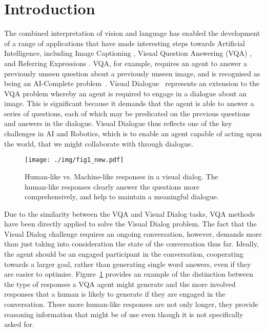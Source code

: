 \documentclass[10pt,twocolumn,letterpaper]{article}
\begin{document}
\section{Introduction}
The combined interpretation of vision and language has enabled the development of a range of applications 
that have made interesting steps towards Artificial Intelligence, including 
Image Captioning \cite{Karpathy2014deepvs,vinyals2014show,wu2015image}, Visual Question Answering (VQA) \cite{antol2015vqa,ren2015image,wu2015ask}, and Referring Expressions \cite{Hu_2016_CVPR,KazemzadehOrdonezMattenBergEMNLP14,yu2016modeling}. 
VQA, for example, requires an agent to answer a previously unseen question about a previously unseen image, and is recognised as being an AI-Complete problem~\cite{antol2015vqa}.
Visual Dialogue~\cite{das2016visual} represents an extension to the VQA problem whereby an agent is required to engage in a dialogue about an image.  This is significant because it demands that the agent is able to answer a series of questions, each of which may be predicated on the previous questions and answers in the dialogue.
Visual Dialogue thus reflects one of the key challenges in AI and Robotics, which is to enable an agent capable of acting upon the world, that we might collaborate with through dialogue.
\begin{figure}[t!]
\centering
  \texttt{[image: ./img/fig1\_new.pdf]}
  \vspace{-3pt}
  \caption{Human-like vs. Machine-like responses in a visual dialog. The human-like responses clearly answer the questions more comprehensively, and help to maintain a meaningful dialogue.}
  \label{img:example}
  \vspace{-10pt}
\end{figure}

Due to the similarity between the VQA and Visual Dialog tasks, VQA methods \cite{lu2016hierarchical,yang2015stacked} have been directly applied to solve the Visual Dialog problem. 
The fact that the Visual Dialog challenge requires an ongoing conversation, however, demands more than just taking into consideration the state of the conversation thus far.
Ideally, the agent should be an engaged participant in the conversation, cooperating towards a larger goal, rather than generating single word answers, even if they are easier to optimise.
Figure~\ref{img:example} provides an example of the distinction between the type of responses a VQA agent might generate and the more involved responses that a human is likely to generate if they are engaged in the conversation.  These more human-like responses are not only longer, they provide reasoning information that might be of use even though it is not specifically asked for.
\end{document}

